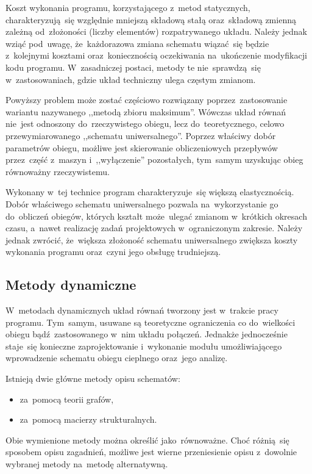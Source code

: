 Koszt wykonania programu, korzystającego z~metod statycznych,
charakteryzują~się względnie mniejszą składową stałą oraz~składową
zmienną zależną od~złożoności (liczby elementów) rozpatrywanego układu.
Należy jednak wziąć pod~uwagę, że~każdorazowa zmiana schematu wiązać~się
będzie z~kolejnymi kosztami oraz~koniecznością oczekiwania na~ukończenie
modyfikacji kodu programu. W~zasadniczej postaci, metody te
nie~sprawdzą~się w~zastosowaniach, gdzie układ techniczny ulega częstym
zmianom.

Powyższy problem może zostać częściowo rozwiązany poprzez~zastosowanie
wariantu nazywanego ,,metodą zbioru maksimum''. Wówczas układ równań
nie~jest odnoszony do~rzeczywistego obiegu, lecz do~teoretycznego,
celowo przewymiarowanego ,,schematu uniwersalnego''. Poprzez właściwy
dobór parametrów obiegu, możliwe jest skierowanie obliczeniowych
przepływów przez~część z~maszyn i~,,wyłączenie'' pozostałych, tym~samym
uzyskując obieg równoważny rzeczywistemu.

Wykonany w~tej technice program charakteryzuje~się większą
elastycznością. Dobór właściwego schematu uniwersalnego pozwala
na~wykorzystanie go do~obliczeń obiegów, których kształt może~ulegać
zmianom w~krótkich okresach czasu, a~nawet realizację zadań projektowych
w~ograniczonym zakresie. Należy jednak zwrócić, że~większa złożoność
schematu uniwersalnego zwiększa koszty wykonania programu oraz~czyni
jego obsługę trudniejszą.


\subsection{Metody dynamiczne}

W~metodach dynamicznych układ równań tworzony jest w~trakcie pracy
programu. Tym~samym, usuwane są teoretyczne ograniczenia co do~wielkości
obiegu bądź~zastosowanego w~nim układu połączeń. Jednakże jednocześnie
staje~się konieczne zaprojektowanie i~wykonanie modułu umożliwiającego
wprowadzenie schematu obiegu cieplnego oraz~jego analizę.

Istnieją dwie główne metody opisu schematów:

\begin{itemize}
	\item za~pomocą teorii grafów,

	\item za~pomocą macierzy strukturalnych.
\end{itemize}

Obie wymienione metody można określić jako~równoważne. Choć różnią~się
sposobem opisu zagadnień, możliwe jest wierne przeniesienie opisu
z~dowolnie wybranej metody na~metodę alternatywną.


